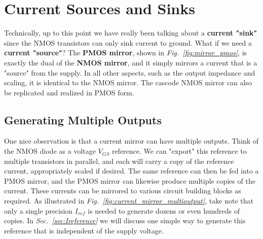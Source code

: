 \section{Current Sources and Sinks}
Technically, up to this point we have really been talking about a \textbf{current "sink"} since the NMOS transistors can only sink current to ground.  What if we need a \textbf{current "source"}?  The \textbf{PMOS mirror}, shown in \emph{Fig.~\ref{fig:mirror_pmos}}, is exactly the dual of the \textbf{NMOS mirror}, and it simply mirrors a current that is a "source" from the supply.  In all other aspects, such as the output impedance and scaling, it is identical to the NMOS mirror.  The cascode NMOS mirror can also be replicated and realized in PMOS form. 
\subsection{Generating Multiple Outputs}
One nice observation is that a current mirror can have multiple outputs.  Think of the NMOS diode as a voltage $V_{GS}$ reference.  We can "export" this reference to multiple transistors in parallel, and each will carry a copy of the reference current, appropriately scaled if desired.  The same reference can then be fed into a PMOS mirror, and the PMOS mirror can likewise produce multiple copies of the current.  These currents can be mirrored to various circuit building blocks as required.  As illustrated in \emph{Fig.~\ref{fig:current_mirror_multioutput}}, take note that only a single precision $I_{ref}$ is needed to generate dozens or even hundreds of copies.  In \emph{Sec.~\ref{sec:Ireference}} we will discuss one simple way to generate this reference that is independent of the supply voltage.
\newpage
